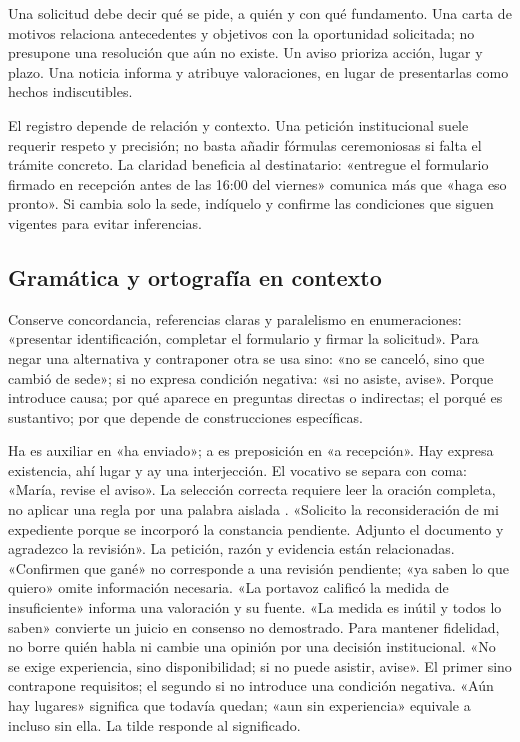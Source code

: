 Una solicitud debe decir qué se pide, a quién y con qué fundamento. Una carta de motivos relaciona antecedentes y objetivos con la oportunidad solicitada; no presupone una resolución que aún no existe. Un aviso prioriza acción, lugar y plazo. Una noticia informa y atribuye valoraciones, en lugar de presentarlas como hechos indiscutibles.

El registro depende de relación y contexto. Una petición institucional suele requerir respeto y precisión; no basta añadir fórmulas ceremoniosas si falta el trámite concreto. La claridad beneficia al destinatario: «entregue el formulario firmado en recepción antes de las 16:00 del viernes» comunica más que «haga eso pronto». Si cambia solo la sede, indíquelo y confirme las condiciones que siguen vigentes para evitar inferencias.

\subsection{Gramática y ortografía en contexto}
Conserve concordancia, referencias claras y paralelismo en enumeraciones: «presentar identificación, completar el formulario y firmar la solicitud». Para negar una alternativa y contraponer otra se usa sino: «no se canceló, sino que cambió de sede»; si no expresa condición negativa: «si no asiste, avise». Porque introduce causa; por qué aparece en preguntas directas o indirectas; el porqué es sustantivo; por que depende de construcciones específicas.

Ha es auxiliar en «ha enviado»; a es preposición en «a recepción». Hay expresa existencia, ahí lugar y ay una interjección. El vocativo se separa con coma: «María, revise el aviso». La selección correcta requiere leer la oración completa, no aplicar una regla por una palabra aislada \cite[entradas sino, porque, haber, ahí y ay]{rae}.
«Solicito la reconsideración de mi expediente porque se incorporó la constancia pendiente. Adjunto el documento y agradezco la revisión». La petición, razón y evidencia están relacionadas. «Confirmen que gané» no corresponde a una revisión pendiente; «ya saben lo que quiero» omite información necesaria.
«La portavoz calificó la medida de insuficiente» informa una valoración y su fuente. «La medida es inútil y todos lo saben» convierte un juicio en consenso no demostrado. Para mantener fidelidad, no borre quién habla ni cambie una opinión por una decisión institucional.
«No se exige experiencia, sino disponibilidad; si no puede asistir, avise». El primer sino contrapone requisitos; el segundo si no introduce una condición negativa. «Aún hay lugares» significa que todavía quedan; «aun sin experiencia» equivale a incluso sin ella. La tilde responde al significado.
